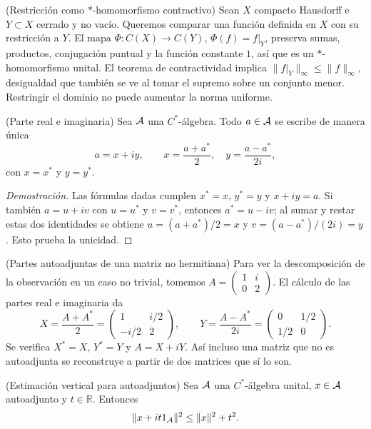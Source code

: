 \begin{cthejemplo}{(Restricción como $*$-homomorfismo contractivo)}
Sean $X$ compacto Hausdorff e $Y\subset X$ cerrado y no vacío.
Queremos comparar una función definida en $X$ con su restricción a
$Y$. El mapa $\Phi:C(X)\to C(Y)$,
$\Phi(f)=f|_Y$, preserva sumas, productos, conjugación puntual y la
función constante $1$, así que es un $*$-homomorfismo unital.
El teorema de contractividad implica
$\|f|_Y\|_\infty\le\|f\|_\infty$, desigualdad que también se ve al
tomar el supremo sobre un conjunto menor. Restringir el dominio no
puede aumentar la norma uniforme.
\end{cthejemplo}

\begin{cthobservacion}{(Parte real e imaginaria)}
Sea $\mathcal A$ una $C^*$-álgebra. Todo $a\in\mathcal A$ se escribe de manera única
\[
 a=x+iy,
 \qquad
 x=\frac{a+a^*}{2},\quad y=\frac{a-a^*}{2i},
\]
con $x=x^*$ y $y=y^*$.
\end{cthobservacion}

\begin{proof}[Demostración]
Las fórmulas dadas cumplen $x^*=x$, $y^*=y$ y $x+iy=a$. Si también
$a=u+iv$ con $u=u^*$ y $v=v^*$, entonces $a^*=u-iv$; al sumar y restar
estas dos identidades se obtiene $u=(a+a^*)/2=x$ y
$v=(a-a^*)/(2i)=y$. Esto prueba la unicidad.
\end{proof}

\begin{cthejemplo}{(Partes autoadjuntas de una matriz no hermitiana)}
Para ver la descomposición de la observación en un caso no trivial,
tomemos
$A=\begin{pmatrix}1&i\\0&2\end{pmatrix}$.
El cálculo de las partes real e imaginaria da
\[
 X=\frac{A+A^*}{2}
 =\begin{pmatrix}1&i/2\\-i/2&2\end{pmatrix},
 \qquad
 Y=\frac{A-A^*}{2i}
 =\begin{pmatrix}0&1/2\\1/2&0\end{pmatrix}.
\]
Se verifica $X^*=X$, $Y^*=Y$ y $A=X+iY$.
Así incluso una matriz que no es autoadjunta se reconstruye a
partir de dos matrices que sí lo son.
\end{cthejemplo}

\begin{cthlema}{(Estimación vertical para autoadjuntos)}
Sea $\mathcal A$ una $C^*$-álgebra unital, $x\in\mathcal A$ autoadjunto y $t\in\mathbb R$. Entonces
\[
 \|x+it1_\mathcal A\|^2\le \|x\|^2+t^2.
\]
\end{cthlema}

